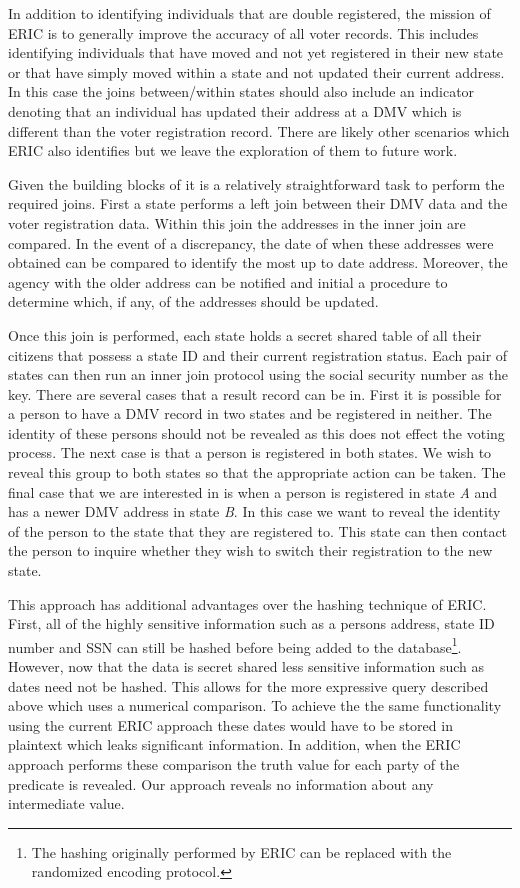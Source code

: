 In addition to identifying individuals that are double registered, the mission of ERIC is to generally improve the accuracy of all voter records. This includes identifying individuals that have moved and not yet registered in their new state or that have simply moved within a state and not updated their current address. In this case the joins between/within states should also include an indicator denoting that an individual has updated their address at a DMV which is different than the voter registration record. There are likely other scenarios which ERIC also identifies but we leave the exploration of them to future work.

Given the building blocks of  it is a relatively straightforward task to perform the required joins. First a state performs a left join between their DMV data and the voter registration data. Within this join the addresses in the inner join are compared. In the event of a discrepancy, the date of when these addresses were obtained can be compared to identify the most up to date address. Moreover, the agency with the older address can be notified and initial a procedure to determine which, if any, of the addresses should be updated. 


Once this join is performed, each state holds a secret shared table of all their citizens that possess a state ID and their current registration status. Each pair of states can then run an inner join protocol using the social security number as the key. There are several cases that a result record can be in. First it is possible for a person to have a DMV record in two states and be registered in neither. The identity of these persons should not be revealed as this does not effect the voting process. The next case is that a person is registered in both states. We wish to reveal this group to both states so that the appropriate action can be taken. The final case that we are interested in is when a person is registered in state \emph{A} and has a newer DMV address in state \emph{B}. In this case we want to reveal the identity of the person to the state that they are registered to. This state can then contact the person to inquire whether they wish to switch their registration to the new state. 


This approach has additional advantages over the hashing technique of ERIC. First, all of the highly sensitive information such as a persons address, state ID number and SSN can still be hashed before being added to the database\footnote{The hashing originally performed by ERIC can be replaced with the randomized encoding protocol.}. However, now that the data is secret shared less sensitive information such as dates need not be hashed. This allows for the more expressive query described above which uses a numerical comparison. To achieve the the same functionality using the current ERIC approach these dates would have to be stored in plaintext which leaks significant information. In addition, when the ERIC approach performs these comparison the truth value for each party of the predicate is revealed. Our approach reveals no information about any intermediate value. 

